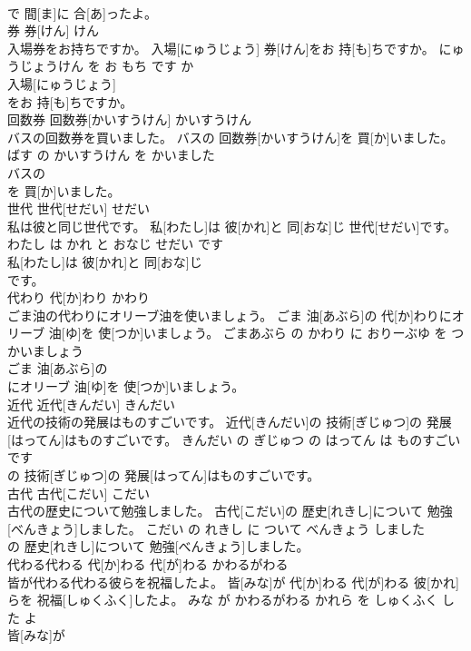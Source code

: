 \documentclass[8pt]{extreport}
\begin{document}
\begin{CJK}{UTF8}{min}
\\	で 間[ま]に 合[あ]ったよ。			
\\	券	券[けん]	けん	
\\	入場券をお持ちですか。	入場[にゅうじょう] 券[けん]をお 持[も]ちですか。	にゅうじょうけん を お もち です か	
\\	入場[にゅうじょう]
\\	をお 持[も]ちですか。			
\\	回数券	回数券[かいすうけん]	かいすうけん	
\\	バスの回数券を買いました。	バスの 回数券[かいすうけん]を 買[か]いました。	ばす の かいすうけん を かいました	
\\	バスの
\\	を 買[か]いました。			
\\	世代	世代[せだい]	せだい	
\\	私は彼と同じ世代です。	私[わたし]は 彼[かれ]と 同[おな]じ 世代[せだい]です。	わたし は かれ と おなじ せだい です	
\\	私[わたし]は 彼[かれ]と 同[おな]じ
\\	です。			
\\	代わり	代[か]わり	かわり	
\\	ごま油の代わりにオリーブ油を使いましょう。	ごま 油[あぶら]の 代[か]わりにオリーブ 油[ゆ]を 使[つか]いましょう。	ごまあぶら の かわり に おりーぶゆ を つかいましょう	
\\	ごま 油[あぶら]の
\\	にオリーブ 油[ゆ]を 使[つか]いましょう。			
\\	近代	近代[きんだい]	きんだい	
\\	近代の技術の発展はものすごいです。	近代[きんだい]の 技術[ぎじゅつ]の 発展[はってん]はものすごいです。	きんだい の ぎじゅつ の はってん は ものすごい です	
\\	の 技術[ぎじゅつ]の 発展[はってん]はものすごいです。			
\\	古代	古代[こだい]	こだい	
\\	古代の歴史について勉強しました。	古代[こだい]の 歴史[れきし]について 勉強[べんきょう]しました。	こだい の れきし に ついて べんきょう しました	
\\	の 歴史[れきし]について 勉強[べんきょう]しました。			
\\	代わる代わる	代[か]わる 代[が]わる	かわるがわる	
\\	皆が代わる代わる彼らを祝福したよ。	皆[みな]が 代[か]わる 代[が]わる 彼[かれ]らを 祝福[しゅくふく]したよ。	みな が かわるがわる かれら を しゅくふく した よ	
\\	皆[みな]が

\end{CJK}
\end{document}
